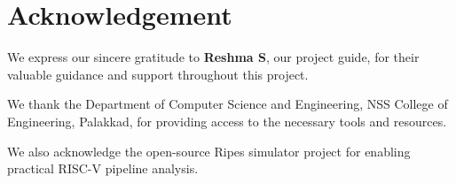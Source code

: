 \chapter*{Acknowledgement}

We express our sincere gratitude to \textbf{Reshma S}, our project guide, for their valuable guidance and support throughout this project. 

We thank the Department of Computer Science and Engineering, NSS College of Engineering, Palakkad, for providing access to the necessary tools and resources. 

We also acknowledge the open-source Ripes simulator project for enabling practical RISC-V pipeline analysis.
\newpage
